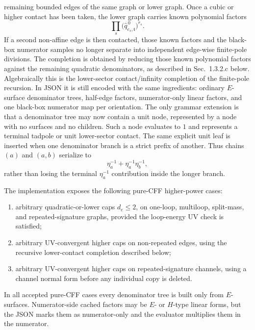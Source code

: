 \documentclass[11pt,a4paper]{report}
\begin{document}
remaining bounded edges of the same graph or lower graph.  Once a cubic or
higher contact has been taken, the lower graph carries known
polynomial factors
\[
  \prod_s \bigl(\widehat q_{e_s,\mathfrak t}^{\,0}\bigr)^{r_s}.
\]
If a second non-affine edge is then contacted, those known factors and the
black-box numerator samples no longer separate into independent edge-wise
finite-pole divisions.  The completion is obtained by reducing those known
polynomial factors against the remaining quadratic denominators, as described
in Sec.~1.3.2.c below.  Algebraically this is the lower-sector
contact/infinity completion of the finite-pole recursion.  In JSON it is still
encoded with the same ingredients: ordinary \(E\)-surface denominator trees,
half-edge factors, numerator-only linear factors, and one black-box numerator
map per orientation.  The only grammar extension is that a denominator tree may
now contain a unit node, represented by a node with no surfaces and no
children.  Such a node evaluates to \(1\) and represents a terminal tadpole or
unit lower-sector contact.  The same explicit unit leaf is inserted when one
denominator branch is a strict prefix of another.  Thus chains \((a)\) and
\((a,b)\) serialize to
\[
  \eta_a^{-1}+\eta_a^{-1}\eta_b^{-1},
\]
rather than losing the terminal \(\eta_a^{-1}\) contribution inside the longer
branch.

The implementation exposes the following pure-CFF higher-power cases:
\begin{enumerate}[leftmargin=2em]
  \item arbitrary quadratic-or-lower caps \(d_e\le2\), on one-loop,
        multiloop, split-mass, and repeated-signature graphs, provided the
        loop-energy UV check is satisfied;
  \item arbitrary UV-convergent higher caps on non-repeated edges, using the
        recursive lower-contact completion described below;
  \item arbitrary UV-convergent higher caps on repeated-signature channels,
        using a channel normal form before any individual copy is deleted.
\end{enumerate}
In all accepted pure-CFF cases every denominator tree is built only from
\(E\)-surfaces.  Numerator-side cached factors may be \(E\)- or \(H\)-type
linear forms, but the JSON marks them as numerator-only and the evaluator
multiplies them in the numerator.
\end{document}
